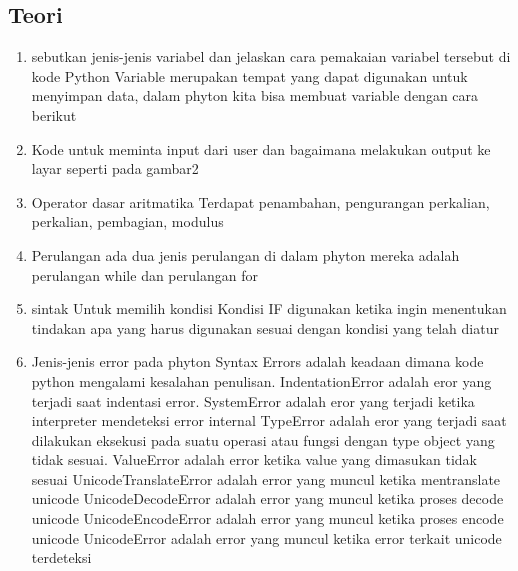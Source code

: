 \subsection{Teori}
\begin{enumerate}

\item sebutkan jenis-jenis variabel dan jelaskan cara pemakaian variabel tersebut di kode Python
Variable merupakan tempat yang dapat digunakan untuk menyimpan data, dalam phyton kita bisa membuat variable dengan cara berikut

\item Kode untuk meminta input dari user dan bagaimana melakukan output ke layar seperti pada gambar2

\item Operator dasar aritmatika
Terdapat penambahan, pengurangan perkalian, perkalian, pembagian, modulus

\item Perulangan
ada dua jenis perulangan di dalam phyton mereka adalah perulangan while dan perulangan for

\item sintak Untuk memilih kondisi
Kondisi IF digunakan ketika ingin menentukan tindakan apa yang harus digunakan sesuai dengan kondisi yang telah diatur

\item Jenis-jenis error pada phyton
Syntax Errors adalah keadaan dimana kode python mengalami kesalahan penulisan. 
IndentationError adalah eror yang terjadi saat indentasi error.
SystemError adalah eror yang terjadi ketika interpreter mendeteksi error internal
TypeError adalah eror yang terjadi saat dilakukan eksekusi pada suatu operasi atau fungsi dengan type object yang tidak sesuai.
ValueError adalah error ketika value yang dimasukan tidak sesuai
UnicodeTranslateError adalah error yang muncul ketika mentranslate unicode
UnicodeDecodeError adalah error yang muncul ketika  proses decode unicode
UnicodeEncodeError adalah error yang muncul ketika  proses encode unicode
UnicodeError adalah error yang muncul ketika error terkait unicode terdeteksi

\end{enumerate}

